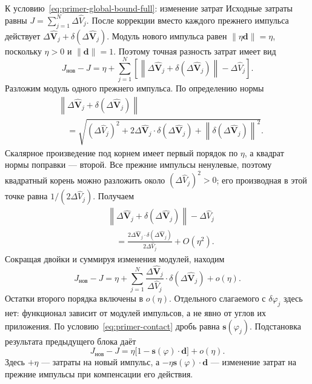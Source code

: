 \begin{explanation}{К условию~\eqref{eq:primer-global-bound-full}: изменение затрат}
Исходные затраты равны $J=\sum_{j=1}^N\Delta\widehat V_j$.
После коррекции вместо каждого прежнего импульса действует
$\Delta\widehat{\boldsymbol V}_j+
\delta(\Delta\widehat{\boldsymbol V}_j)$.
Модуль нового импульса равен $\|\eta\boldsymbol d\|=\eta$,
поскольку $\eta>0$ и $\|\boldsymbol d\|=1$.
Поэтому точная разность затрат имеет вид
\[
 J_{\text{нов}}-J
 =\eta+\sum_{j=1}^N\left[
   \left\|\Delta\widehat{\boldsymbol V}_j+
               \delta(\Delta\widehat{\boldsymbol V}_j)\right\|
       -\Delta\widehat V_j\right].
\]
Разложим модуль одного прежнего импульса. По определению нормы
\[
\begin{aligned}
 &\left\|\Delta\widehat{\boldsymbol V}_j+
                    \delta(\Delta\widehat{\boldsymbol V}_j)\right\|\\
 &\quad=\sqrt{(\Delta\widehat V_j)^2
        +2\Delta\widehat{\boldsymbol V}_j\cdot
                          \delta(\Delta\widehat{\boldsymbol V}_j)
        +\left\|\delta(\Delta\widehat{\boldsymbol V}_j)\right\|^2}.
\end{aligned}
\]
Скалярное произведение под корнем имеет первый порядок по $\eta$,
а квадрат нормы поправки --- второй. Все прежние импульсы
ненулевые, поэтому квадратный корень можно разложить около
$(\Delta\widehat V_j)^2>0$; его производная в этой точке равна
$1/(2\Delta\widehat V_j)$. Получаем
\[
\begin{aligned}
 &\left\|\Delta\widehat{\boldsymbol V}_j+
                    \delta(\Delta\widehat{\boldsymbol V}_j)\right\|
                    -\Delta\widehat V_j\\
 &\quad=\frac{2\Delta\widehat{\boldsymbol V}_j\cdot
                    \delta(\Delta\widehat{\boldsymbol V}_j)}
                    {2\Delta\widehat V_j}+O(\eta^2).
\end{aligned}
\]
Сокращая двойки и суммируя изменения модулей, находим
\[
 J_{\text{нов}}-J
 =\eta+\sum_{j=1}^N
       \frac{\Delta\widehat{\boldsymbol V}_j}{\Delta\widehat V_j}
          \cdot\delta(\Delta\widehat{\boldsymbol V}_j)+o(\eta).
\]
Остатки второго порядка включены в $o(\eta)$.
Отдельного слагаемого с $\delta\varphi_j$ здесь нет:
функционал зависит от модулей импульсов, а не явно от углов их приложения.
По условию~\eqref{eq:primer-contact} дробь равна
$\boldsymbol s(\varphi_j)$. Подстановка результата предыдущего
блока даёт
\[
 \boxed{\quad J_{\text{нов}}-J
   =\eta\bigl[1-\boldsymbol s(\varphi)\cdot\boldsymbol d\bigr]
       +o(\eta).\quad}
\]
Здесь $+\eta$ --- затраты на новый импульс,
а $-\eta\boldsymbol s(\varphi)\cdot\boldsymbol d$ --- изменение
затрат на прежние импульсы при компенсации его действия.


\end{explanation}
